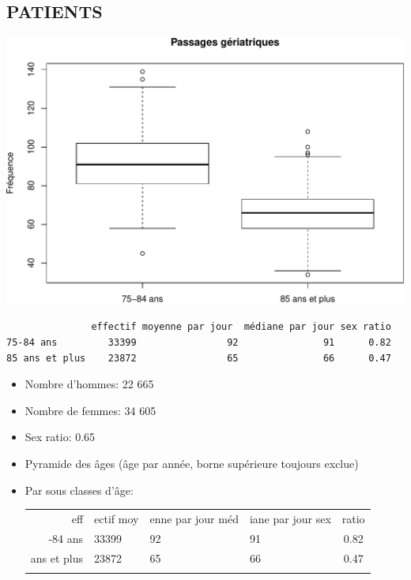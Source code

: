 \documentclass[]{article}
\begin{document}
\subsection{PATIENTS}\label{patients-2}

\includegraphics{rapport2014_V4_files/figure-latex/sexe75-1.pdf}

\begin{verbatim}
               effectif moyenne par jour  médiane par jour sex ratio
75-84 ans         33399                92               91      0.82
85 ans et plus    23872                65               66      0.47
\end{verbatim}

\begin{itemize}
\item
  Nombre d'hommes: 22 665
\item
  Nombre de femmes: 34 605
\item
  Sex ratio: 0.65
\item
  Pyramide des âges (âge par année, borne supérieure toujours exclue)
\item
  Par sous classes d'âge:

  \begin{longtable}[c]{@{}rlllc@{}}
  \toprule\addlinespace
  eff & ectif moy & enne par jour méd & iane par jour sex & ratio
  \\\addlinespace
  \midrule\endhead
  75-84 ans & 33399 & 92 & 91 & 0.82
  \\\addlinespace
  85 ans et plus & 23872 & 65 & 66 & 0.47
  \\\addlinespace
  \bottomrule
  \end{longtable}
\end{itemize}
\end{document}
